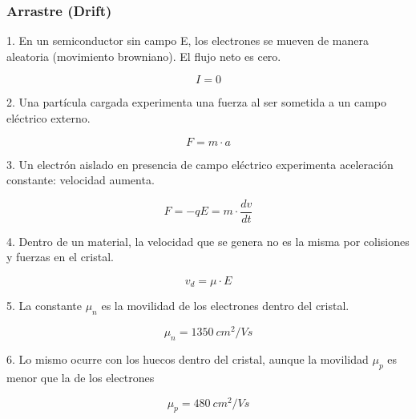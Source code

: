 \documentclass[10pt,t,aspectratio=169]{beamer}
\begin{document}
\begin{frame}[t]
    \frametitle{Arrastre (Drift)}

    \begin{multicols}{2}
        1. En un semiconductor sin campo E, los electrones se mueven de manera aleatoria (movimiento browniano). El flujo neto es cero.

        \[ I = 0 \]

        2. Una partícula cargada experimenta una fuerza al ser sometida a un campo eléctrico externo.

        \[ F = m\cdot{}a \]

        3. Un electrón aislado en presencia de campo eléctrico experimenta aceleración constante: velocidad aumenta.

        \[ F = -qE = m\cdot{}\dfrac{dv}{dt} \]

        4. Dentro de un material, la velocidad que se genera no es la misma por colisiones y fuerzas en el cristal. 

        \[ v_d = \mu{}\cdot{}E \]

        5. La constante $\mu_n$ es la movilidad de los electrones dentro del cristal.

        \[ \mu_n = 1350\ cm^2/Vs \]

        6. Lo mismo ocurre con los huecos dentro del cristal, aunque la movilidad $\mu_p$ es menor que la de los electrones

        \[ \mu_p = 480\ cm^2/Vs \]
    \end{multicols}
\end{frame}
\end{document}
